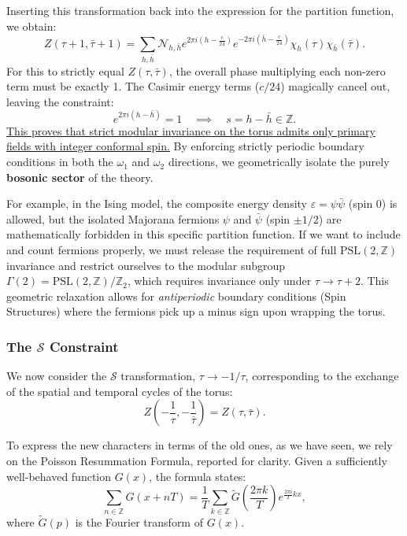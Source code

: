 Inserting this transformation back into the expression for the partition function, we obtain:
\[
    Z(\tau+1, \bar{\tau}+1) = \sum_{h, \bar{h}} \mathcal{N}_{h,\bar{h}} e^{2 \pi i \left(h - \frac{c}{24}\right)} e^{-2 \pi i \left(\bar{h} - \frac{c}{24}\right)} \chi_h(\tau)\chi_{\bar{h}}(\bar{\tau}).
\]
For this to strictly equal $Z(\tau, \bar{\tau})$, the overall phase multiplying each non-zero term must be exactly 1. The Casimir energy terms ($c/24$) magically cancel out, leaving the constraint:
\[
    e^{2\pi i (h - \bar{h})} = 1 \quad \implies \quad s = h - \bar{h} \in \mathbb{Z}.
\]
\uline{This proves that strict modular invariance on the torus admits only primary fields with integer conformal spin.} By enforcing strictly periodic boundary conditions in both the $\omega_1$ and $\omega_2$ directions, we geometrically isolate the purely \textbf{bosonic sector} of the theory.

For example, in the Ising model, the composite energy density $\varepsilon = \psi\bar{\psi}$ (spin 0) is allowed, but the isolated Majorana fermions $\psi$ and $\bar{\psi}$ (spin $\pm 1/2$) are mathematically forbidden in this specific partition function. If we want to include and count fermions properly, we must release the requirement of full $\mathrm{PSL}(2,\mathbb{Z})$ invariance and restrict ourselves to the modular subgroup \(\Gamma(2) = \mathrm{PSL}(2,\mathbb{Z})/\mathbb{Z}_{2}\), which requires invariance only under $\tau \to \tau + 2$. This geometric relaxation allows for \textit{antiperiodic} boundary conditions (Spin Structures) where the fermions pick up a minus sign upon wrapping the torus.

\subsubsection{The $\mathcal{S}$ Constraint}

We now consider the $\mathcal{S}$ transformation, $\tau \to -1/\tau$, corresponding to the exchange of the spatial and temporal cycles of the torus:
\[
    Z\left(-\frac{1}{\tau}, -\frac{1}{\bar{\tau}}\right) = Z(\tau, \bar{\tau}).
\]

To express the new characters in terms of the old ones, as we have seen, we rely on the Poisson Resummation Formula, reported for clarity. Given a sufficiently well-behaved function $G(x)$, the formula states:
\[
    \sum_{n \in \mathbb{Z}} G(x + n T) = \frac{1}{T} \sum_{k \in \mathbb{Z}} \tilde{G}\left(\frac{2 \pi k}{T}\right)e^{\frac{2 \pi i}{T}kx},
\]
where $\tilde{G}(p)$ is the Fourier transform of $G(x)$.


